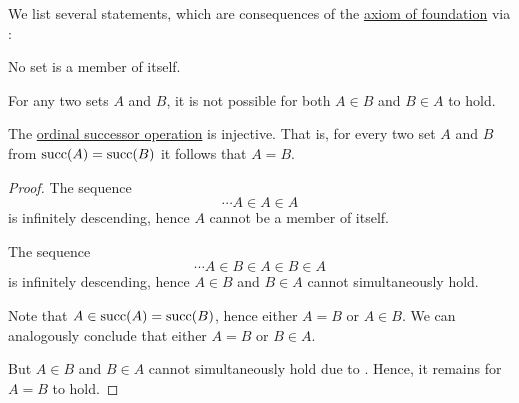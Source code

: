 \begin{corollary}\label{thm:simple_foundation_theorems}
  We list several statements, which are consequences of the \hyperref[def:zfc/foundation]{axiom of foundation} via :

  \begin{thmenum}
     No set is a member of itself.

     For any two sets \( A \) and \( B \), it is not possible for both \( A \in B \) and \( B \in A \) to hold.

     The \hyperref[def:ordinal_successor]{ordinal successor operation} is injective. That is, for every two set \( A \) and \( B \) from \( \operatorname{succ}(A) = \operatorname{succ}(B) \) it follows that \( A = B \).
  \end{thmenum}
\end{corollary}
\begin{proof}
   The sequence
  \begin{equation*}
    \cdots A \in A \in A
  \end{equation*}
  is infinitely descending, hence \( A \) cannot be a member of itself.

   The sequence
  \begin{equation*}
    \cdots A \in B \in A \in B \in A
  \end{equation*}
  is infinitely descending, hence \( A \in B \) and \( B \in A \) cannot simultaneously hold.

   Note that \( A \in \operatorname{succ}(A) = \operatorname{succ}(B) \), hence either \( A = B \) or \( A \in B \). We can analogously conclude that either \( A = B \) or \( B \in A \).

  But \( A \in B \) and \( B \in A \) cannot simultaneously hold due to . Hence, it remains for \( A = B \) to hold.
\end{proof}

